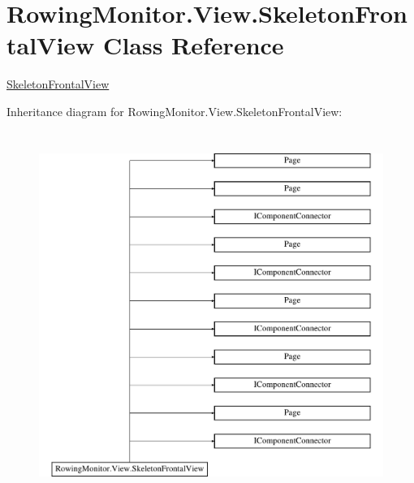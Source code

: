 \hypertarget{class_rowing_monitor_1_1_view_1_1_skeleton_frontal_view}{}\section{Rowing\+Monitor.\+View.\+Skeleton\+Frontal\+View Class Reference}
\label{class_rowing_monitor_1_1_view_1_1_skeleton_frontal_view}


\hyperlink{class_rowing_monitor_1_1_view_1_1_skeleton_frontal_view}{Skeleton\+Frontal\+View}  


Inheritance diagram for Rowing\+Monitor.\+View.\+Skeleton\+Frontal\+View\+:\begin{figure}[H]
\begin{center}
\leavevmode
\includegraphics[height=12.000000cm]{class_rowing_monitor_1_1_view_1_1_skeleton_frontal_view}
\end{center}
\end{figure}
